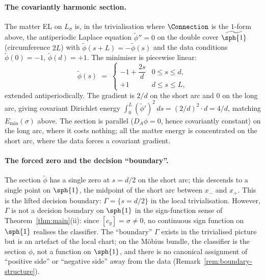 \paragraph{The covariantly harmonic section.} The matter EL on
$L_\sigma$ is, in the trivialisation where $\Connection$ is the
$1$-form above, the antiperiodic Laplace equation $\tilde\phi''=0$
on the double cover $\widetilde{\sph{1}}$ (circumference $2L$) with
$\tilde\phi(s+L)=-\tilde\phi(s)$ and the data conditions
$\tilde\phi(0)=-1$, $\tilde\phi(d)=+1$. The minimiser is piecewise
linear:
\[
   \tilde\phi(s) \;=\;
   \begin{cases}
      -1 + \dfrac{2s}{d} & 0 \leq s \leq d, \\[6pt]
      +1 & d \leq s \leq L,
   \end{cases}
\]
extended antiperiodically. The gradient is $2/d$ on the short arc
and $0$ on the long arc, giving covariant Dirichlet energy
$\int_0^L(\tilde\phi')^2\,ds = (2/d)^2\cdot d = 4/d$, matching
$E_{\min}(\sigma)$ above. The section is parallel ($D_A\phi=0$,
hence covariantly constant) on the long arc, where it costs nothing;
all the matter energy is concentrated on the short arc, where the
data forces a covariant gradient.

\paragraph{The forced zero and the decision ``boundary''.} The
section $\tilde\phi$ has a single zero at $s=d/2$ on the short arc;
this descends to a single point on $\sph{1}$, the midpoint of the
short arc between $x_-$ and $x_+$. This is the lifted decision
boundary: $\Gamma=\{s=d/2\}$ in the local trivialisation. However,
$\Gamma$ is not a decision boundary on $\sph{1}$ in the
sign-function sense of Theorem~\ref{thm:main}(ii): since
$[c_y]=\sigma\neq 0$, no continuous sign function on $\sph{1}$
realises the classifier. The ``boundary'' $\Gamma$ exists in the
trivialised picture but is an artefact of the local chart; on the
M\"obius bundle, the classifier is the section $\phi$, not a
function on $\sph{1}$, and there is no canonical assignment of
``positive side'' or ``negative side'' away from the data
(Remark~\ref{rem:boundary-structure}).

